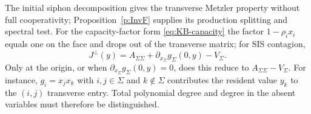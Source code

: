 The initial siphon decomposition gives the transverse Metzler property
without full cooperativity; Proposition~\ref{p:InvF} supplies its
production splitting and spectral test. For the
capacity-factor form \eqref{eq:KB-capacity} the factor $1-\rho_ix_i$ equals one
on the face and drops out of the transverse matrix; for SIS contagion,
\[
 J^\perp(y)=A_{\Sigma\Sigma}+\partial_{x_\Sigma}g_\Sigma(0,y)-V_\Sigma.
\]
Only at the origin, or when $\partial_{x_\Sigma}g_\Sigma(0,y)=0$, does this
reduce to $A_{\Sigma\Sigma}-V_\Sigma$. For instance, $g_i=x_jx_k$ with
$i,j\in \Sigma$ and $k\notin \Sigma$ contributes the resident value $y_k$
to the $(i,j)$ transverse entry. Total polynomial degree and degree
in the absent variables must therefore be distinguished.
\eeR

